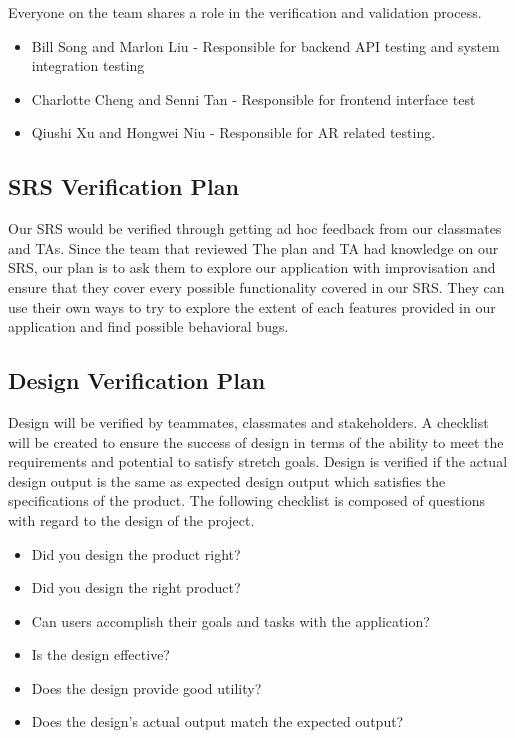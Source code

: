 \documentclass[12pt, titlepage]{article}
\begin{document}
\noindent
Everyone on the team shares a role in the verification and validation process.
\begin{itemize}
    \item Bill Song and Marlon Liu - Responsible for backend API testing and system integration testing
    \item Charlotte Cheng and Senni Tan - Responsible for frontend interface test
    \item Qiushi Xu and Hongwei Niu - Responsible for AR related testing. 
\end{itemize} 

 

\subsection{SRS Verification Plan}

 
\noindent
Our SRS would be verified through getting ad hoc feedback from our classmates and TAs. Since the team that reviewed The plan and TA had knowledge on our SRS, our plan is to ask them to explore our application with improvisation and ensure that they cover every possible functionality covered in our SRS. They can use their own ways to try to explore the extent of each features provided in our application and find possible behavioral bugs. 

\subsection{Design Verification Plan}

Design will be verified by teammates, classmates and stakeholders. A checklist will be created to ensure the success of design in terms of the ability to meet the requirements and potential to satisfy stretch goals. Design is verified if the actual design output is the same as expected design output which satisfies the specifications of the product. The following checklist is composed of questions with regard to the design of the project.
\begin{itemize}
    \item Did you design the product right?
    \item Did you design the right product?
    \item Can users accomplish their goals and tasks with the application?
    \item Is the design effective?
    \item Does the design provide good utility?
    \item Does the design's actual output match the expected output?
\end{itemize}
\end{document}
